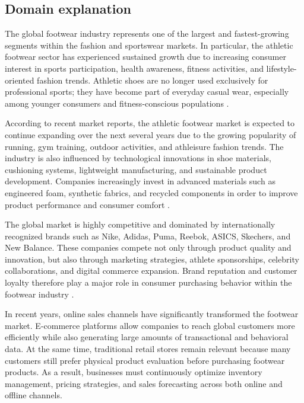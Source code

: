 \documentclass[12pt]{article}
\begin{document}
\subsection{Domain explanation}

The global footwear industry represents one of the largest and fastest-growing segments within the fashion and sportswear markets. In particular, the athletic footwear sector has experienced sustained growth due to increasing consumer interest in sports participation, health awareness, fitness activities, and lifestyle-oriented fashion trends. Athletic shoes are no longer used exclusively for professional sports; they have become part of everyday casual wear, especially among younger consumers and fitness-conscious populations \cite{grandview_athletic_footwear_2024}.

According to recent market reports, the athletic footwear market is expected to continue expanding over the next several years due to the growing popularity of running, gym training, outdoor activities, and athleisure fashion trends. The industry is also influenced by technological innovations in shoe materials, cushioning systems, lightweight manufacturing, and sustainable product development. Companies increasingly invest in advanced materials such as engineered foam, synthetic fabrics, and recycled components in order to improve product performance and consumer comfort \cite{grandview_athletic_footwear_2024}.

The global market is highly competitive and dominated by internationally recognized brands such as Nike, Adidas, Puma, Reebok, ASICS, Skechers, and New Balance. These companies compete not only through product quality and innovation, but also through marketing strategies, athlete sponsorships, celebrity collaborations, and digital commerce expansion. Brand reputation and customer loyalty therefore play a major role in consumer purchasing behavior within the footwear industry \cite{footwear_brands_2025}.

In recent years, online sales channels have significantly transformed the footwear market. E-commerce platforms allow companies to reach global customers more efficiently while also generating large amounts of transactional and behavioral data. At the same time, traditional retail stores remain relevant because many customers still prefer physical product evaluation before purchasing footwear products. As a result, businesses must continuously optimize inventory management, pricing strategies, and sales forecasting across both online and offline channels.
\end{document}
